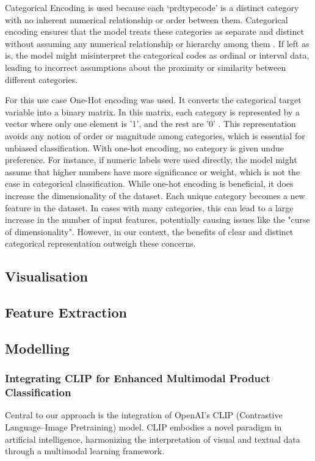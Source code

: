 Categorical Encoding is used because each ‘prdtypecode’ is a distinct category with no inherent numerical relationship or order between them. Categorical encoding ensures that the model treats these categories as separate and distinct without assuming any numerical relationship or hierarchy among them \cite{potdar-2017}. If left as is, the model might misinterpret the categorical codes as ordinal or interval  data, leading to incorrect assumptions about the proximity or similarity between different categories.
  
For this use case One-Hot encoding was used. It converts the categorical target variable into a binary matrix. In this matrix, each category is represented by a vector where only one element is '1', and the rest are '0' \cite{cerda-2018}. This representation avoids any notion of order or magnitude among categories, which is essential for unbiased classification.  
With one-hot encoding, no category is given undue preference. For instance, if numeric labels were used directly, the model might assume that higher numbers have more significance or weight, which is not the case in categorical classification.  
While one-hot encoding is beneficial, it does increase the dimensionality of the dataset. Each unique category becomes a new feature in the dataset. In cases with many categories, this can lead to a large increase in the number of input features, potentially causing issues like the "curse of dimensionality"\cite{altman-2018}. However, in our context, the benefits of clear and distinct categorical representation outweigh these concerns.

\subsection{Visualisation}

\subsection{Feature Extraction}

\subsection{Modelling}

\subsubsection{Integrating CLIP for Enhanced Multimodal Product Classification}
Central to our approach is the integration of OpenAI's CLIP (Contrastive Language–Image Pretraining) model. CLIP embodies a novel paradigm in artificial intelligence, harmonizing the interpretation of visual and textual data through a multimodal learning framework.

